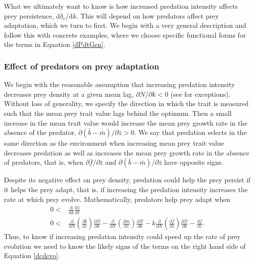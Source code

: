 \documentclass[11pt]{article}
\begin{document}
What we ultimately want to know is how increased predation intensity affects prey persistence, $\mathrm{d}\delta_c/\mathrm{d} k$.
This will depend on how predators affect prey adaptation, which we turn to first.
We begin with a very general description and follow this with concrete examples, where we choose specific functional forms for the terms in Equation \eqref{dPdtGen}.

\subsubsection*{Effect of predators on prey adaptation}

We begin with the reasonable assumption that increasing predation intensity decreases prey density at a given mean lag, $\partial N/\partial k < 0$ (see \citealt{Abrams2009b} for exceptions). 
Without loss of generality, we specify the direction in which the trait is measured such that the mean prey trait value lags behind the optimum.
Then a small increase in the mean trait value would increase the mean prey growth rate in the absence of the predator, $\partial(\bar{b}-\bar{m})/\partial \bar{z} > 0$.
We say that predation selects in the same direction as the environment when increasing mean prey trait value decreases predation as well as increases the mean prey growth rate in the absence of predators, that is, when $\partial \bar{f}/\partial\bar{z}$ and $\partial (\bar{b} - \bar{m})/\partial\bar{z}$ have opposite signs.

Despite its negative effect on prey density, predation could help the prey persist if it helps the prey adapt, that is, if increasing the predation intensity increases the rate at which prey evolve. 
Mathematically, predators help prey adapt when
\begin{equation}\label{dcdevo}
\begin{aligned}
0<&\frac{\mathrm{d}}{\mathrm{d}k} \frac{\mathrm{d}\bar{z}}{\mathrm{d}t}\\
0<& \frac{\partial}{\partial N} \left( \frac{\partial \bar{b}}{\partial\bar{z}} \right) \frac{\partial N}{\partial k} - \frac{\partial}{\partial N} \left( \frac{\partial\bar{m}}{\partial\bar{z}} \right) \frac{\partial N}{\partial k} - k \frac{\partial }{\partial N} \left( \frac{\partial\bar{f}}{\partial\bar{z}} \right) \frac{\partial N}{\partial k} - \frac{\partial \bar{f}}{\partial\bar{z}}  .
\end{aligned}
\end{equation}
Thus, to know if increasing predation intensity could speed up the rate of prey evolution we need to know the likely signs of the terms on the right hand side of Equation \eqref{dcdevo}.
\end{document}
